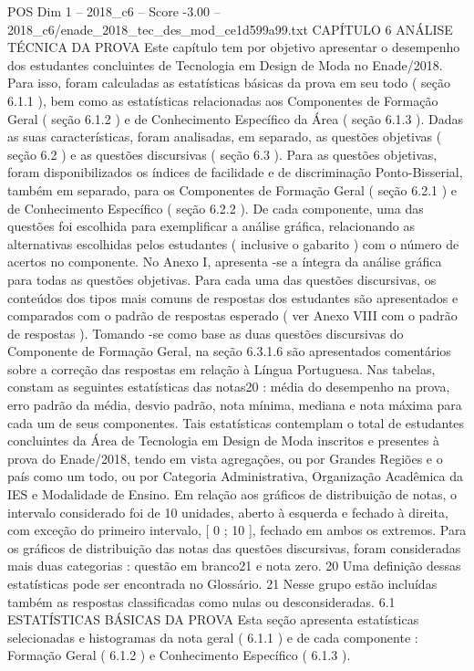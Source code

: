 \begin{textsample}{POS Dim 1 – 2018\_c6 – Score -3.00 – 2018\_c6/enade\_2018\_tec\_des\_mod\_ce1d599a99.txt}  \label{ex:f1_pos_248}
CAPÍTULO 6 ANÁLISE TÉCNICA DA PROVA Este capítulo tem por objetivo apresentar o desempenho dos estudantes concluintes de Tecnologia em Design de Moda no Enade/2018.
Para isso, foram calculadas as estatísticas básicas da prova em seu todo ( seção 6.1.1 ), bem como as estatísticas relacionadas aos Componentes de Formação Geral ( seção 6.1.2 ) e de Conhecimento Específico da Área ( seção 6.1.3 ).
Dadas as suas características, foram analisadas, em separado, as questões objetivas ( seção 6.2 ) e as questões discursivas ( seção 6.3 ).
Para as questões objetivas, foram disponibilizados os índices de facilidade e de discriminação Ponto-Bisserial, também em separado, para os Componentes de Formação Geral ( seção 6.2.1 ) e de Conhecimento Específico ( seção 6.2.2 ).
De cada componente, uma das questões foi escolhida para exemplificar a análise gráfica, relacionando as alternativas escolhidas pelos estudantes ( inclusive o gabarito ) com o número de acertos no componente.
No Anexo I, apresenta -se a íntegra da análise gráfica para todas as questões objetivas.
Para cada uma das questões discursivas, os conteúdos dos tipos mais comuns de respostas dos estudantes são apresentados e comparados com o padrão de respostas esperado ( ver Anexo VIII com o padrão de respostas ).
Tomando -se como base as duas questões discursivas do Componente de Formação Geral, na seção 6.3.1.6 são apresentados comentários sobre a correção das respostas em relação à Língua Portuguesa.
Nas tabelas, constam as seguintes estatísticas das notas20 : média do desempenho na prova, erro padrão da média, desvio padrão, nota mínima, mediana e nota máxima para cada um de seus componentes.
Tais estatísticas contemplam o total de estudantes concluintes da Área de Tecnologia em Design de Moda inscritos e presentes à prova do Enade/2018, tendo em vista agregações, ou por Grandes Regiões e o país como um todo, ou por Categoria Administrativa, Organização Acadêmica da IES e Modalidade de Ensino.
Em relação aos gráficos de distribuição de notas, o intervalo considerado foi de 10 unidades, aberto à esquerda e fechado à direita, com exceção do primeiro intervalo, [ 0 ; 10 ], fechado em ambos os extremos.
Para os gráficos de distribuição das notas das questões discursivas, foram consideradas mais duas categorias : questão em branco21 e nota zero. 20 Uma definição dessas estatísticas pode ser encontrada no Glossário. 21 Nesse grupo estão incluídas também as respostas classificadas como nulas ou desconsideradas. 6.1 ESTATÍSTICAS BÁSICAS DA PROVA Esta seção apresenta estatísticas selecionadas e histogramas da nota geral ( 6.1.1 ) e de cada componente : Formação Geral ( 6.1.2 ) e Conhecimento Específico ( 6.1.3 ).

\end{textsample}
